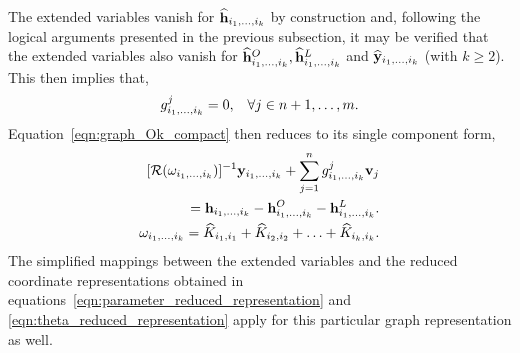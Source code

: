The extended variables vanish for $\widehat{\mathbf{h}}_{i_{1},\ldots,i_{k}}$ by construction and, following the logical arguments presented in the previous subsection, it may be verified that the extended variables also vanish for $\widehat{\mathbf{h}}^{O}_{i_{1},\ldots,i_{k}}, \widehat{\mathbf{h}}^{L}_{i_{1},\ldots,i_{k}}$ and $\widehat{\mathbf{y}}_{i_{1},\ldots,i_{k}}$ (with $k\ge2$). This then implies that, 
\begin{align}
	\label{eqn:graph_gk_definition2}
	g^{j}_{i_{1},\ldots,i_{k}}= 0, && \forall j\in n+1,\ldots,m.
\end{align}
Equation~\eqref{eqn:graph_Ok_compact} then reduces to its single component form,
\begin{subequations}
\label{eqn:graph_Ok_compact2}
\begin{align}
	\begin{aligned}
		\Resolvent{\omega_{i_{1},\ldots,i_{k}}}^{-1}\AsCenM_{i_{1},\ldots,i_{k}} + \sum^{n}_{j=1}\AsParamEl^{j}_{i_{1},\ldots,i_{k}}\Devec_{j} \\
		= \AsForcing_{i_{1},\ldots,i_{k}} - \AsForcingO_{i_{1},\ldots,i_{k}} 
		- \AsForcingL_{i_{1},\ldots,i_{k}}.
	\end{aligned} \\
	\omega_{i_{1},\ldots,i_{k}} = \widehat{K}_{i_{1},i_{1}} + \widehat{K}_{i_{2},i_{2}} + \ldots + \widehat{K}_{i_{k},i_{k}}.
\end{align}
\end{subequations}
The simplified mappings between the extended variables and the reduced coordinate representations obtained in equations~\eqref{eqn:parameter_reduced_representation} and \eqref{eqn:theta_reduced_representation} apply for this particular graph representation as well. 

